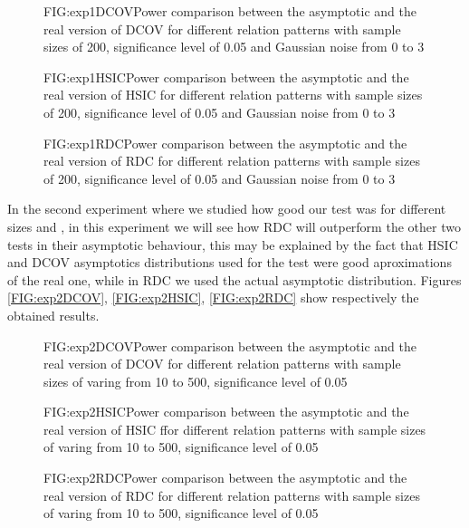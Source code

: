 \begin{figure}[Experiment 1 DCOV asymptotic vs real]{FIG:exp1DCOV}{Power comparison between the asymptotic and the real version of DCOV for different relation patterns with sample sizes of 200, significance level of 0.05 and Gaussian noise from 0 to 3}
\end{figure}
\begin{figure}[Experiment 1 HSIC asymptotic vs real]{FIG:exp1HSIC}{Power comparison between the asymptotic and the real version of HSIC for different relation patterns with sample sizes of 200, significance level of 0.05 and Gaussian noise from 0 to 3}
\end{figure}
\begin{figure}[Experiment 1 RDC asymptotic vs real]{FIG:exp1RDC}{Power comparison between the asymptotic and the real version of RDC for different relation patterns with sample sizes of 200, significance level of 0.05 and Gaussian noise from 0 to 3}
\end{figure}


In the second experiment where we studied how good our test was for different sizes and , in this experiment we will see how RDC will outperform the other two tests in their asymptotic behaviour, this may be explained by the fact that HSIC and DCOV asymptotics distributions used for the test were good aproximations of the real one, while in RDC we used the actual asymptotic distribution. Figures \ref{FIG:exp2DCOV}, \ref{FIG:exp2HSIC}, \ref{FIG:exp2RDC} show respectively the obtained results.

\begin{figure}[Experiment 2 DCOV asymptotic vs real]{FIG:exp2DCOV}{Power comparison between the asymptotic and the real version of DCOV for different relation patterns with sample sizes of varing from 10 to 500, significance level of 0.05}
\end{figure}
\begin{figure}[Experiment 2 HSIC asymptotic vs real]{FIG:exp2HSIC}{Power comparison between the asymptotic and the real version of HSIC ffor different relation patterns with sample sizes of varing from 10 to 500, significance level of 0.05}
\end{figure}
\begin{figure}[Experiment 2 RDC asymptotic vs real]{FIG:exp2RDC}{Power comparison between the asymptotic and the real version of RDC for different relation patterns with sample sizes of varing from 10 to 500, significance level of 0.05}
\end{figure}


